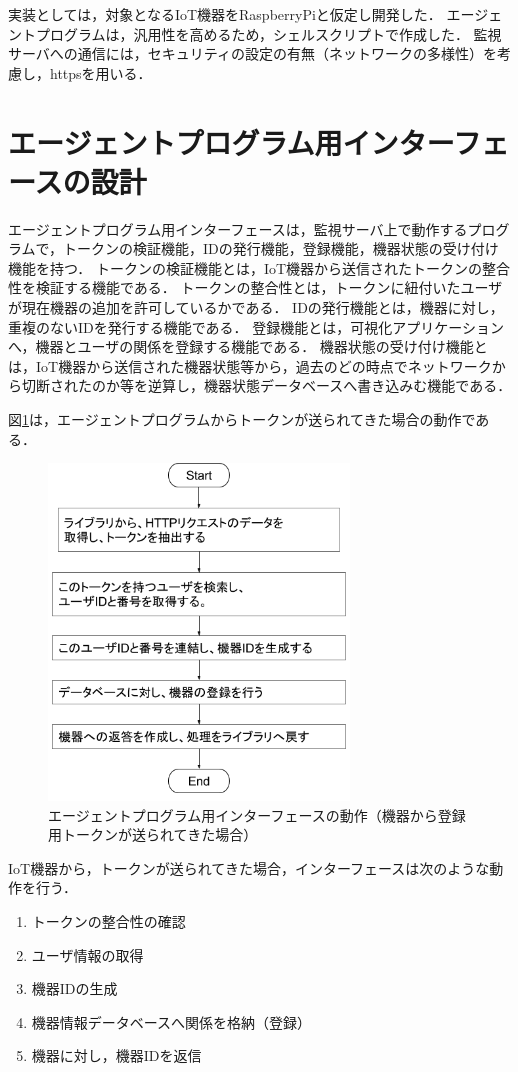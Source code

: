 実装としては，対象となるIoT機器をRaspberryPiと仮定し開発した．
エージェントプログラムは，汎用性を高めるため，シェルスクリプトで作成した．
監視サーバへの通信には，セキュリティの設定の有無（ネットワークの多様性）を考慮し，httpsを用いる．

\section{エージェントプログラム用インターフェースの設計}
エージェントプログラム用インターフェースは，監視サーバ上で動作するプログラムで，トークンの検証機能，IDの発行機能，登録機能，機器状態の受け付け機能を持つ．
トークンの検証機能とは，IoT機器から送信されたトークンの整合性を検証する機能である．
トークンの整合性とは，トークンに紐付いたユーザが現在機器の追加を許可しているかである．
IDの発行機能とは，機器に対し，重複のないIDを発行する機能である．
登録機能とは，可視化アプリケーションへ，機器とユーザの関係を登録する機能である．
機器状態の受け付け機能とは，IoT機器から送信された機器状態等から，過去のどの時点でネットワークから切断されたのか等を逆算し，機器状態データベースへ書き込みむ機能である．

図\ref{fig:interface_flowA}は，エージェントプログラムからトークンが送られてきた場合の動作である．
\begin{figure}[htbp]
\begin{center}
\includegraphics[width=8cm]{images/interface_flow.png}
\caption{エージェントプログラム用インターフェースの動作（機器から登録用トークンが送られてきた場合）}
\label{fig:interface_flowA}
\end{center}
\end{figure}
IoT機器から，トークンが送られてきた場合，インターフェースは次のような動作を行う．
\begin{enumerate}
\item トークンの整合性の確認
\item ユーザ情報の取得
\item 機器IDの生成
\item 機器情報データベースへ関係を格納（登録）
\item 機器に対し，機器IDを返信
\end{enumerate}

